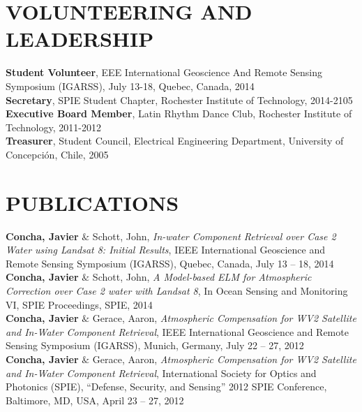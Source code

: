 \documentclass[11pt]{res} %
\begin{document}
\begin{resume}
\section{VOLUNTEERING AND LEADERSHIP}
\vspace{0.1in}
{\bf Student Volunteer}, EEE International Geoscience And Remote Sensing Symposium (IGARSS), July 13-18, Quebec, Canada, 2014
\vspace{0.1in}\\
{\bf Secretary}, SPIE Student Chapter, Rochester Institute of Technology, 2014-2105
\vspace{0.1in}\\
{\bf Executive Board Member}, Latin Rhythm Dance Club, Rochester Institute of Technology, 2011-2012
\vspace{0.1in}\\
{\bf Treasurer}, Student Council, Electrical Engineering Department, University of Concepci\'on, Chile, 2005\\


\vspace{-0.1in}
\section{PUBLICATIONS}
\vspace{0.1in}
{\bf Concha, Javier} $\&$ Schott, John, {\it In-water Component Retrieval over Case 2 Water using Landsat 8: Initial Results}, IEEE International Geoscience and Remote Sensing Symposium (IGARSS), Quebec, Canada, July 13 -- 18, 2014
\vspace{0.1in}\\
{\bf Concha, Javier} $\&$ Schott, John, {\it A Model-based ELM for Atmospheric Correction over Case 2 water with Landsat 8}, In Ocean Sensing and Monitoring VI, SPIE Proceedings, SPIE, 2014
\vspace{0.1in}\\
{\bf Concha, Javier} $\&$ Gerace, Aaron, {\it Atmospheric Compensation for WV2 Satellite and In-Water Component Retrieval}, IEEE International Geoscience and Remote Sensing Symposium (IGARSS), Munich, Germany, July 22 -- 27, 2012
\vspace{0.1in}\\
{\bf Concha, Javier} $\&$ Gerace, Aaron, {\it Atmospheric Compensation for WV2 Satellite and In-Water Component Retrieval}, International Society for Optics and Photonics (SPIE), ``Defense, Security, and Sensing'' 2012 SPIE Conference, Baltimore, MD, USA, April 23 -- 27, 2012\\


\end{resume}
\end{document}
